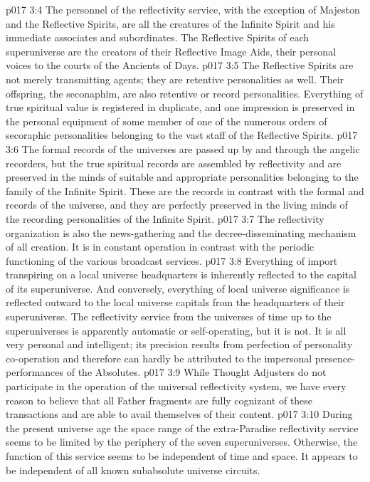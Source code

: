 \vs p017 3:4 The personnel of the reflectivity service, with the exception of Majeston and the Reflective Spirits, are all the creatures of the Infinite Spirit and his immediate associates and subordinates. The Reflective Spirits of each superuniverse are the creators of their Reflective Image Aids, their personal voices to the courts of the Ancients of Days.
\pc \vs p017 3:5 The Reflective Spirits are not merely transmitting agents; they are retentive personalities as well. Their offspring, the seconaphim, are also retentive or record personalities. Everything of true spiritual value is registered in duplicate, and one impression is preserved in the personal equipment of some member of one of the numerous orders of secoraphic personalities belonging to the vast staff of the Reflective Spirits.
\vs p017 3:6 The formal records of the universes are passed up by and through the angelic recorders, but the true spiritual records are assembled by reflectivity and are preserved in the minds of suitable and appropriate personalities belonging to the family of the Infinite Spirit. These are the  records in contrast with the formal and  records of the universe, and they are perfectly preserved in the living minds of the recording personalities of the Infinite Spirit.
\vs p017 3:7 The reflectivity organization is also the news\hyp{}gathering and the decree\hyp{}disseminating mechanism of all creation. It is in constant operation in contrast with the periodic functioning of the various broadcast services.
\vs p017 3:8 Everything of import transpiring on a local universe headquarters is inherently reflected to the capital of its superuniverse. And conversely, everything of local universe significance is reflected outward to the local universe capitals from the headquarters of their superuniverse. The reflectivity service from the universes of time up to the superuniverses is apparently automatic or self\hyp{}operating, but it is not. It is all very personal and intelligent; its precision results from perfection of personality co\hyp{}operation and therefore can hardly be attributed to the impersonal presence\hyp{}performances of the Absolutes.
\vs p017 3:9 While Thought Adjusters do not participate in the operation of the universal reflectivity system, we have every reason to believe that all Father fragments are fully cognizant of these transactions and are able to avail themselves of their content.
\pc \vs p017 3:10 During the present universe age the space range of the extra\hyp{}Paradise reflectivity service seems to be limited by the periphery of the seven superuniverses. Otherwise, the function of this service seems to be independent of time and space. It appears to be independent of all known subabsolute universe circuits.\plusone
